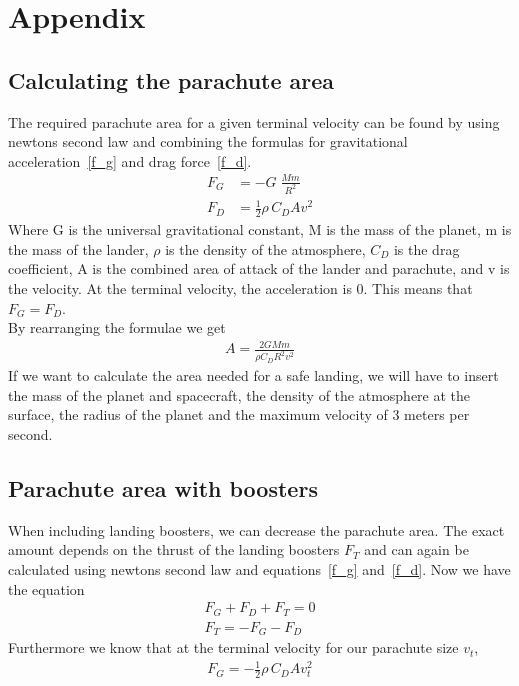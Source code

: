 \documentclass[reprint,english,notitlepage]{revtex4-2}
\begin{document}
\section{Appendix} \label{sec:appendix}
\subsection{Calculating the parachute area}\label{subsec:calculating-the-parachute-area}
    The required parachute area for a given terminal velocity can be found by using newtons second law and combining the formulas for gravitational acceleration~\eqref{f_g} and drag force~\eqref{f_d}.
    \begin{align}
        F_G &= -G\;\frac{M m}{R^2} \label{f_g}\\
        F_D &= \frac{1}{2}\rho \,C_D A v^2 \label{f_d}
    \end{align}
    Where G is the universal gravitational constant, M is the mass of the planet, m is the mass of the lander, $\rho$ is the density of the atmosphere, $C_D$ is the drag coefficient, A is the combined area of attack of the lander and parachute, and v is the velocity.
    At the terminal velocity, the acceleration is 0.
    This means that $F_G = F_D$.\\
    By rearranging the formulae we get
    \begin{align*}
        A = \frac{2 G M m}{\rho C_D R^2 v^2}
    \end{align*}
    If we want to calculate the area needed for a safe landing, we will have to insert the mass of the planet and spacecraft, the density of the atmosphere at the surface, the radius of the planet and the maximum velocity of 3 meters per second.


\subsection{Parachute area with boosters}\label{subsec:parachute-area-with-boosters}
    When including landing boosters, we can decrease the parachute area.
    The exact amount depends on the thrust of the landing boosters $F_T$ and can again be calculated using newtons second law and equations~\eqref{f_g} and~\ref{f_d}.
    Now we have the equation
    \begin{align}
        F_G + F_D + F_T = 0\\
        F_T = - F_G - F_D \label{eq1}
    \end{align}
Furthermore we know that at the terminal velocity for our parachute size $v_t$,
\begin{align}
    F_G = -\frac{1}{2}\rho \,C_D A v_t^2 \label{f_g1}
\end{align}
\end{document}
